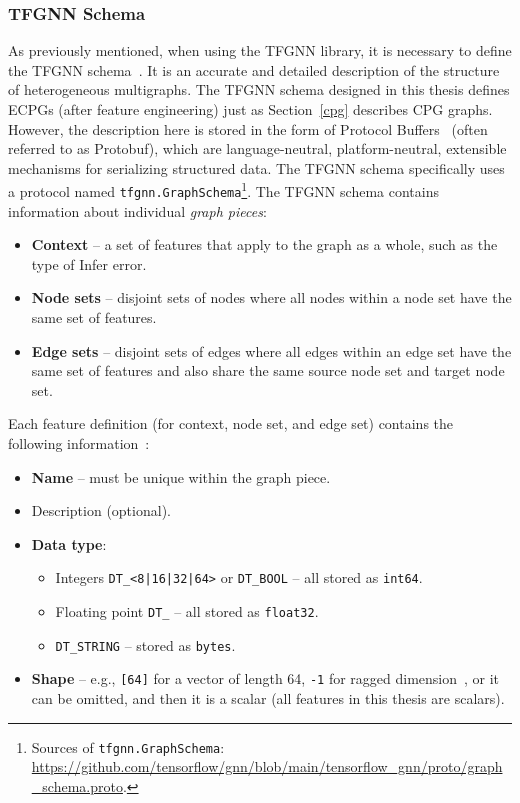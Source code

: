 \subsubsection{TFGNN Schema}
As previously mentioned, when using the TFGNN library, it is necessary to define the TFGNN schema~\cite{tfgnn-schema}. It is an accurate and detailed description of the structure of heterogeneous multigraphs. The TFGNN schema designed in this thesis defines ECPGs (after feature engineering) just as Section~\ref{cpg} describes CPG graphs. However, the description here is stored in the form of Protocol Buffers~\cite{protobuf} (often referred to as Protobuf), which are language-neutral, platform-neutral, extensible mechanisms for serializing structured data. The TFGNN schema specifically uses a protocol named \texttt{tfgnn.GraphSchema}\footnote{Sources of \texttt{tfgnn.GraphSchema}: \url{https://github.com/tensorflow/gnn/blob/main/tensorflow_gnn/proto/graph_schema.proto}.}. The TFGNN schema contains information about individual \textit{graph pieces}:
\begin{itemize}
    \item \textbf{Context} -- a set of features that apply to the graph as a whole, such as the type of Infer error.
    \item \textbf{Node sets} -- disjoint sets of nodes where all nodes within a node set have the same set of features.
    \item \textbf{Edge sets} -- disjoint sets of edges where all edges within an edge set have the same set of features and also share the same source node set and target node set.
\end{itemize}

Each feature definition (for context, node set, and edge set) contains the following information~\cite{tfgnn-schema}:
\begin{itemize}
    \item \textbf{Name} -- must be unique within the graph piece.
    \item Description (optional).
    \item \textbf{Data type}:
    \begin{itemize}
        \item Integers \texttt{DT\_<INT|UINT><8|16|32|64>} or \texttt{DT\_BOOL} -- all stored as \texttt{int64}.
        \item Floating point \texttt{DT\_<FLOAT|DOUBLE|HALF|BFLOAT16>} -- all stored as \texttt{float32}.
        \item \texttt{DT\_STRING} -- stored as \texttt{bytes}.
    \end{itemize}
    \item \textbf{Shape} -- e.g., \texttt{[64]} for a vector of length 64, \texttt{-1} for ragged dimension~\cite{tf-ragged}, or it can be omitted, and then it is a scalar (all features in this thesis are scalars).
\end{itemize}

